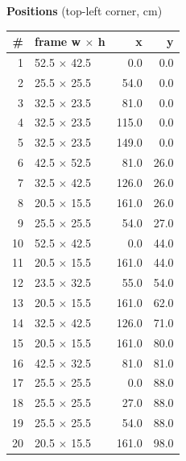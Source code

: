 \documentclass[a4paper,landscape,10pt]{article}
\begin{document}
\begin{minipage}[t]{0.25\textwidth}
\vspace{8pt}
{\bfseries Positions} (top-left corner, cm)\\[2pt]
\tiny
\begin{tabular}{@{}r l r r@{}}
\toprule
\# & frame w $\times$ h & x & y \\
\midrule
1 & 52.5 $\times$ 42.5 & 0.0 & 0.0 \\
2 & 25.5 $\times$ 25.5 & 54.0 & 0.0 \\
3 & 32.5 $\times$ 23.5 & 81.0 & 0.0 \\
4 & 32.5 $\times$ 23.5 & 115.0 & 0.0 \\
5 & 32.5 $\times$ 23.5 & 149.0 & 0.0 \\
6 & 42.5 $\times$ 52.5 & 81.0 & 26.0 \\
7 & 32.5 $\times$ 42.5 & 126.0 & 26.0 \\
8 & 20.5 $\times$ 15.5 & 161.0 & 26.0 \\
9 & 25.5 $\times$ 25.5 & 54.0 & 27.0 \\
10 & 52.5 $\times$ 42.5 & 0.0 & 44.0 \\
11 & 20.5 $\times$ 15.5 & 161.0 & 44.0 \\
12 & 23.5 $\times$ 32.5 & 55.0 & 54.0 \\
13 & 20.5 $\times$ 15.5 & 161.0 & 62.0 \\
14 & 32.5 $\times$ 42.5 & 126.0 & 71.0 \\
15 & 20.5 $\times$ 15.5 & 161.0 & 80.0 \\
16 & 42.5 $\times$ 32.5 & 81.0 & 81.0 \\
17 & 25.5 $\times$ 25.5 & 0.0 & 88.0 \\
18 & 25.5 $\times$ 25.5 & 27.0 & 88.0 \\
19 & 25.5 $\times$ 25.5 & 54.0 & 88.0 \\
20 & 20.5 $\times$ 15.5 & 161.0 & 98.0 \\
\bottomrule
\end{tabular}
\end{minipage}
\clearpage
\end{document}
